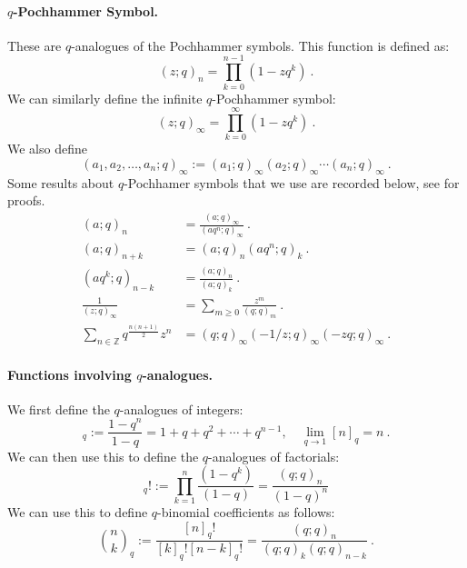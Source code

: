 \documentclass[a4paper,10pt]{article}
\begin{document}
\begin{appendix}
\paragraph{$q$-Pochhammer Symbol.} These are $q$-analogues of the Pochhammer symbols. This function is defined as:
\begin{equation}
    (z;q)_n=\prod_{k=0}^{n-1}(1-zq^k)~.
\end{equation}
We can similarly define the infinite $q$-Pochhammer symbol:
\begin{equation}
    (z;q)_{\infty}=\prod_{k=0}^{\infty}(1-zq^k)~.
\end{equation}
We also define 
\begin{equation}
    (a_1,a_2,\dots,a_n;q)_\infty:=(a_1;q)_\infty(a_2;q)_\infty\cdots (a_n;q)_\infty~.
\end{equation}
Some results about $q$-Pochhamer symbols that we use are recorded below, see \cite{gasper2004basic,andrews1998theory} for proofs.
\begin{align}
    (a ; q)_n &=\frac{(a ; q)_{\infty}}{\left(a q^n ; q\right)_{\infty}}~.
    \\
    (a ; q)_{n+k}&=(a ; q)_n\left(a q^n ; q\right)_k~.
    \\
    \left(a q^k ; q\right)_{n-k}&=\frac{(a ; q)_n}{(a ; q)_k}~.
    \\
    \frac{1}{(z;q)_\infty}&=\sum_{m\geq 0}\frac{z^m}{(q;q)_m}~.
    \\
    \sum_{n \in \mathds{Z}} q^{\frac{n(n+1)}{2}} z^n&=(q ; q)_{\infty}\left(-1/z ; q\right)_{\infty}(-z q ; q)_{\infty}~.
\end{align}

\paragraph{Functions involving $q$-analogues.}
We first define the $q$-analogues of integers:
\begin{equation}
    [n]_q:=\frac{1-q^n}{1-q}=1+q+q^2+\cdots +q^{n-1}, \quad \lim_{q\to 1}[n]_q=n~.
\end{equation}
We can then use this to define the $q$-analogues of factorials:
\begin{equation}
    [n]_q!:=\prod_{k=1}^{n}\frac{(1-q^k)}{(1-q)}=\frac{(q;q)_n}{(1-q)^n}
\end{equation}
We can use this to define $q$-binomial coefficients as follows:
\begin{equation}
    {n\choose k}_q:=\frac{[n]_q!}{[k]_q![n-k]_q!}=\frac{(q;q)_n}{(q;q)_k(q;q)_{n-k}}~.
\end{equation}

\end{appendix}
\end{document}
